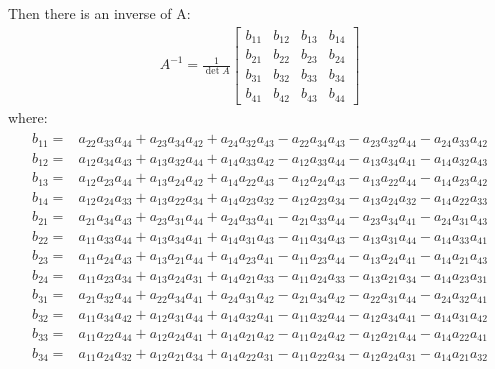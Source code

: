 Then there is an inverse of A:
\begin{gather}
A^{-1} = \frac{1}{\det{A}}
\begin{bmatrix}
b_{11}&b_{12}&b_{13}&b_{14}\\
b_{21}&b_{22}&b_{23}&b_{24}\\
b_{31}&b_{32}&b_{33}&b_{34}\\
b_{41}&b_{42}&b_{43}&b_{44}
\end{bmatrix}
\end{gather}
where:
\begin{align}
	\begin{split}
		b_{11}=&a_{22}a_{33}a_{44}+a_{23}a_{34}a_{42}+a_{24}a_{32}a_{43}-a_{22}a_{34}a_{43}-a_{23}a_{32}a_{44}-a_{24}a_{33}a_{42} \\
		b_{12}=&a_{12}a_{34}a_{43}+a_{13}a_{32}a_{44}+a_{14}a_{33}a_{42}-a_{12}a_{33}a_{44}-a_{13}a_{34}a_{41}-a_{14}a_{32}a_{43} \\
		b_{13}=&a_{12}a_{23}a_{44}+a_{13}a_{24}a_{42}+a_{14}a_{22}a_{43}-a_{12}a_{24}a_{43}-a_{13}a_{22}a_{44}-a_{14}a_{23}a_{42} \\
		b_{14}=&a_{12}a_{24}a_{33}+a_{13}a_{22}a_{34}+a_{14}a_{23}a_{32}-a_{12}a_{23}a_{34}-a_{13}a_{24}a_{32}-a_{14}a_{22}a_{33} \\[1ex]
		b_{21}=&a_{21}a_{34}a_{43}+a_{23}a_{31}a_{44}+a_{24}a_{33}a_{41}-a_{21}a_{33}a_{44}-a_{23}a_{34}a_{41}-a_{24}a_{31}a_{43} \\
		b_{22}=&a_{11}a_{33}a_{44}+a_{13}a_{34}a_{41}+a_{14}a_{31}a_{43}-a_{11}a_{34}a_{43}-a_{13}a_{31}a_{44}-a_{14}a_{33}a_{41} \\
		b_{23}=&a_{11}a_{24}a_{43}+a_{13}a_{21}a_{44}+a_{14}a_{23}a_{41}-a_{11}a_{23}a_{44}-a_{13}a_{24}a_{41}-a_{14}a_{21}a_{43} \\
		b_{24}=&a_{11}a_{23}a_{34}+a_{13}a_{24}a_{31}+a_{14}a_{21}a_{33}-a_{11}a_{24}a_{33}-a_{13}a_{21}a_{34}-a_{14}a_{23}a_{31} \\[1ex]
		b_{31}=&a_{21}a_{32}a_{44}+a_{22}a_{34}a_{41}+a_{24}a_{31}a_{42}-a_{21}a_{34}a_{42}-a_{22}a_{31}a_{44}-a_{24}a_{32}a_{41} \\
		b_{32}=&a_{11}a_{34}a_{42}+a_{12}a_{31}a_{44}+a_{14}a_{32}a_{41}-a_{11}a_{32}a_{44}-a_{12}a_{34}a_{41}-a_{14}a_{31}a_{42} \\
		b_{33}=&a_{11}a_{22}a_{44}+a_{12}a_{24}a_{41}+a_{14}a_{21}a_{42}-a_{11}a_{24}a_{42}-a_{12}a_{21}a_{44}-a_{14}a_{22}a_{41} \\
		b_{34}=&a_{11}a_{24}a_{32}+a_{12}a_{21}a_{34}+a_{14}a_{22}a_{31}-a_{11}a_{22}a_{34}-a_{12}a_{24}a_{31}-a_{14}a_{21}a_{32} \\[1ex]

\end{split}
\end{align}
